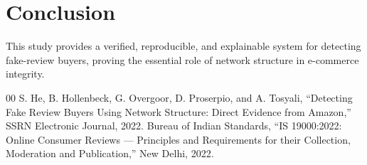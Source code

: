 \documentclass[conference]{IEEEtran}
\begin{document}
\section{Conclusion}
This study provides a verified, reproducible, and explainable system for detecting fake-review buyers, proving the essential role of network structure in e-commerce integrity.

\begin{thebibliography}{00}
 S. He, B. Hollenbeck, G. Overgoor, D. Proserpio, and A. Tosyali, ``Detecting Fake Review Buyers Using Network Structure: Direct Evidence from Amazon,'' SSRN Electronic Journal, 2022.
 Bureau of Indian Standards, ``IS 19000:2022: Online Consumer Reviews --- Principles and Requirements for their Collection, Moderation and Publication,'' New Delhi, 2022.
\end{thebibliography}
\end{document}
